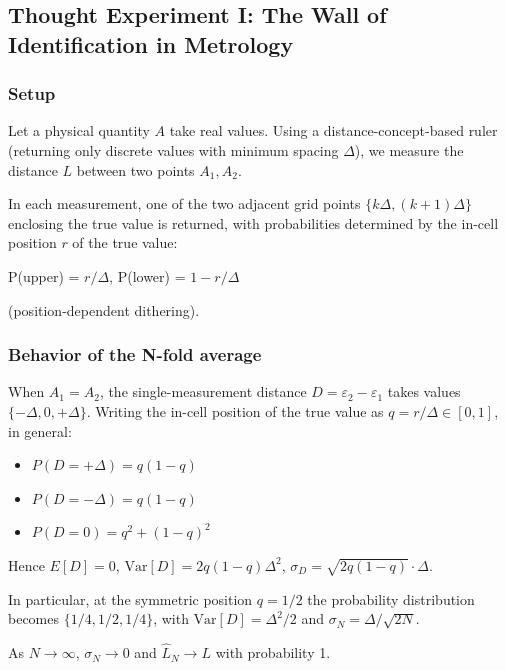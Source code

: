 \documentclass[
]{article}
\providecommand{\tightlist}{%
  \setlength{\itemsep}{0pt}\setlength{\parskip}{0pt}}
\begin{document}
\subsection{Thought Experiment I: The Wall of Identification in
Metrology}\label{thought-experiment-i-the-wall-of-identification-in-metrology}

\subsubsection{Setup}\label{setup}

Let a physical quantity \(A\) take real values. Using a
distance-concept-based ruler (returning only discrete values with
minimum spacing \(\Delta\)), we measure the distance \(L\) between two
points \(A_1, A_2\).

In each measurement, one of the two adjacent grid points
\(\{k\Delta, (k+1)\Delta\}\) enclosing the true value is returned, with
probabilities determined by the in-cell position \(r\) of the true
value:

P(upper) = \(r/\Delta\), P(lower) = \(1 - r/\Delta\)

(position-dependent dithering).

\subsubsection{Behavior of the N-fold
average}\label{behavior-of-the-n-fold-average}

When \(A_1 = A_2\), the single-measurement distance
\(D = \varepsilon_2 - \varepsilon_1\) takes values
\(\{-\Delta, 0, +\Delta\}\). Writing the in-cell position of the true
value as \(q = r/\Delta \in [0, 1]\), in general:

\begin{itemize}
\tightlist
\item
  \(P(D = +\Delta) = q(1-q)\)
\item
  \(P(D = -\Delta) = q(1-q)\)
\item
  \(P(D = 0) = q^2 + (1-q)^2\)
\end{itemize}

Hence \(E[D] = 0\), \(\mathrm{Var}[D] = 2q(1-q)\Delta^2\),
\(\sigma_D = \sqrt{2q(1-q)}\cdot\Delta\).

In particular, at the symmetric position \(q = 1/2\) the probability
distribution becomes \(\{1/4, 1/2, 1/4\}\), with
\(\mathrm{Var}[D] = \Delta^2/2\) and \(\sigma_N = \Delta/\sqrt{2N}\).

As \(N \to \infty\), \(\sigma_N \to 0\) and \(\hat{L}_N \to L\) with
probability 1.
\end{document}
